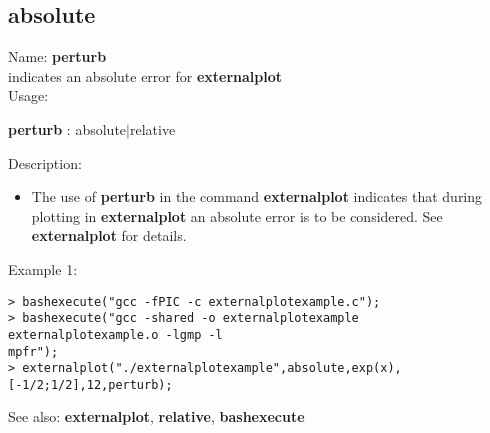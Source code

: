 \subsection{ absolute }
\noindent Name: \textbf{perturb}\\
indicates an absolute error for \textbf{externalplot}\\

\noindent Usage: 
\begin{center}
\textbf{perturb} : \textsf{absolute$|$relative}\\
\end{center}
\noindent Description: \begin{itemize}

\item The use of \textbf{perturb} in the command \textbf{externalplot} indicates that during
   plotting in \textbf{externalplot} an absolute error is to be considered.
   See \textbf{externalplot} for details.
\end{itemize}
\noindent Example 1: 
\begin{center}\begin{minipage}{15cm}\begin{Verbatim}[frame=single]
> bashexecute("gcc -fPIC -c externalplotexample.c");
> bashexecute("gcc -shared -o externalplotexample externalplotexample.o -lgmp -l
mpfr");
> externalplot("./externalplotexample",absolute,exp(x),[-1/2;1/2],12,perturb);
\end{Verbatim}
\end{minipage}\end{center}
See also: \textbf{externalplot}, \textbf{relative}, \textbf{bashexecute}
